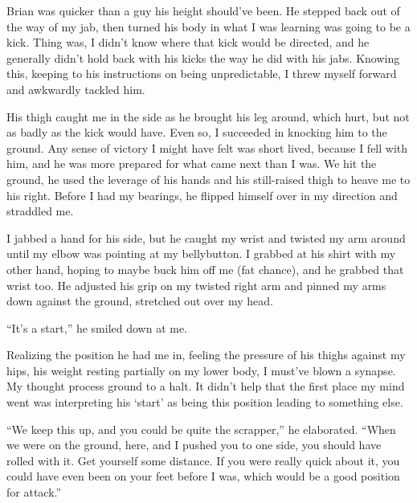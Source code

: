 





Brian was quicker than a guy his height should've been.  He stepped back out of the way of my jab, then turned his body in what I was learning was going to be a kick.  Thing was,  I didn't know where that kick would be directed, and he generally didn't hold back with his kicks the way he did with his jabs.  Knowing this, keeping to his instructions on being unpredictable, I threw myself forward and awkwardly tackled him.



His thigh caught me in the side as he brought his leg around, which hurt, but not as badly as the kick would have.  Even so, I succeeded in knocking him to the ground.  Any sense of victory I might have felt was short lived, because I fell with him, and he was more prepared for what came next than I was.  We hit the ground, he used the leverage of his hands and his still-raised thigh to heave me to his right.  Before I had my bearings, he flipped himself over in my direction and straddled me.



I jabbed a hand for his side, but he caught my wrist and twisted my arm around until my elbow was pointing at my bellybutton.  I grabbed at his shirt with my other hand, hoping to maybe buck him off me (fat chance), and he grabbed that wrist too.  He adjusted his grip on my twisted right arm and pinned my arms down against the ground, stretched out over my head.



``It's a start,'' he smiled down at me.



Realizing the position he had me in, feeling the pressure of his thighs against my hips, his weight resting partially on my lower body, I must've blown a synapse.  My thought process ground to a halt.  It didn't help that the first place my mind went was interpreting his `start' as being this position leading to something else.



``We keep this up, and you could be quite the scrapper,'' he elaborated.  ``When we were on the ground, here, and I pushed you to one side, you should have rolled with it.  Get yourself some distance.  If you were really quick about it, you could have even been on your feet before I was, which would be a good position for attack.''



